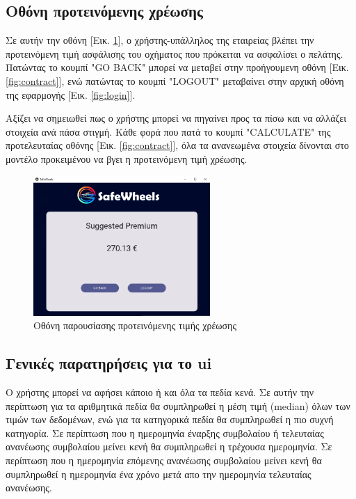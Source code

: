\documentclass{llncs}
\begin{document}
\newpage
\subsection {Οθόνη προτεινόμενης χρέωσης}
Σε αυτήν την οθόνη [Εικ. \ref{fig:premium}], ο χρήστης-υπάλληλος της εταιρείας βλέπει την προτεινόμενη τιμή ασφάλισης του οχήματος που πρόκειται να ασφαλίσει ο πελάτης.
Πατώντας το κουμπί "GO BACK" μπορεί να μεταβεί στην προήγουμενη οθόνη [Εικ. \ref{fig:contract}], ενώ πατώντας το κουμπί "LOGOUT" μεταβαίνει στην αρχική οθόνη της εφαρμογής [Εικ. \ref{fig:login}].

Αξίζει να σημειωθεί πως ο χρήστης μπορεί να πηγαίνει προς τα πίσω και να αλλάζει στοιχεία ανά πάσα στιγμή. Κάθε φορά που πατά το κουμπί "CALCULATE" της προτελευταίας οθόνης [Εικ. \ref{fig:contract}], 
όλα τα ανανεωμένα στοιχεία δίνονται στο μοντέλο προκειμένου να βγει η προτεινόμενη τιμή χρέωσης.

\begin{figure}
    \begin{center}
        \includegraphics[width=0.6\textwidth]{images/suggested_premium.png}
    \end{center}
    \caption{Οθόνη παρουσίασης προτεινόμενης τιμής χρέωσης}  
    \label{fig:premium}  
\end{figure}

\subsection{Γενικές παρατηρήσεις για το ui}
Ο χρήστης μπορεί να αφήσει κάποιο ή και όλα τα πεδία κενά. Σε αυτήν την περίπτωση 
για τα αριθμητικά πεδία θα συμπληρωθεί η μέση τιμή (median) όλων των τιμών των δεδομένων, 
ενώ για τα κατηγορικά πεδία θα συμπληρωθεί η πιο συχνή κατηγορία. Σε περίπτωση που 
η ημερομηνία έναρξης συμβολαίου ή τελευταίας ανανέωσης συμβολαίου μείνει κενή 
θα συμπληρωθεί η τρέχουσα ημερομηνία. 
Σε περίπτωση που η ημερομηνία επόμενης ανανέωσης συμβολαίου μείνει 
κενή θα συμπληρωθεί η ημερομηνία ένα χρόνο μετά απο την ημερομηνία τελευταίας ανανέωσης.
\end{document}
